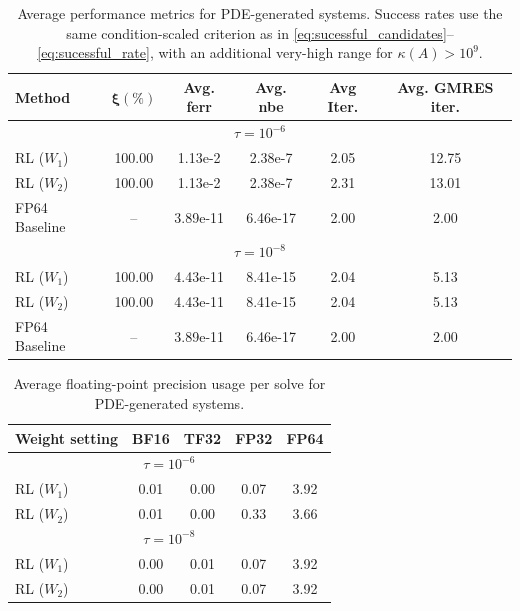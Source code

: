 \documentclass[Afour,sageh,times]{sagej}
\theoremstyle{plain}
\theoremstyle{definition}
\begin{document}
\begin{table}[ht!]
\centering\scriptsize
\setlength{\tabcolsep}{7.5pt}
\renewcommand{\arraystretch}{1.15}
\caption{Average performance metrics for PDE-generated systems. Success rates use the same condition-scaled criterion as in \eqref{eq:sucessful_candidates}--\eqref{eq:sucessful_rate}, with an additional very-high range for $\kappa(A)>10^9$.}
\label{tab:pm_ws_pde}
\begin{tabular}{l
                S[table-format=3.2]
                S[table-format=1.2e-2]
                S[table-format=1.2e-2]
                S[table-format=2.2]
                S[table-format=2.2]}
\toprule
\textbf{Method}
& {$\boldsymbol{\xi(\%)}$}
& {\textbf{Avg. ferr}}
& {\textbf{Avg. nbe}}
& {\textbf{Avg Iter.}}
& {\textbf{Avg. GMRES iter.}}\\
\midrule
{}\\
\midrule
RL ($W_1$)       & 100.00 & 1.13e-2 & 2.38e-7 & 2.05 & 12.75 \\
RL ($W_2$)       & 100.00 & 1.13e-2 & 2.38e-7 & 2.31 & 13.01 \\
FP64 Baseline    & {--}   & 3.89e-11 & 6.46e-17 & 2.00 & 2.00 \\
\midrule[0.55pt]
\\
\midrule
RL ($W_1$)       & 100.00 & 4.43e-11 & 8.41e-15 & 2.04 & 5.13 \\
RL ($W_2$)       & 100.00 & 4.43e-11 & 8.41e-15 & 2.04 & 5.13 \\
FP64 Baseline    & {--}   & 3.89e-11 & 6.46e-17 & 2.00 & 2.00 \\
\bottomrule
\end{tabular}
\end{table}

\begin{table}[ht!]
\centering
\caption{Average floating-point precision usage per solve for PDE-generated systems.}
\label{tab:prec_usage_pde}
\scriptsize
\setlength{\tabcolsep}{8pt}
\renewcommand{\arraystretch}{1.15}
\begin{tabular}{l
                S[table-format=1.2]
                S[table-format=1.2]
                S[table-format=1.2]
                S[table-format=1.2]}
\toprule
\textbf{Weight setting} & \textbf{BF16} & \textbf{TF32} & \textbf{FP32} & \textbf{FP64} \\
\midrule
{}\\
\midrule
{RL ($W_1$)} & 0.01 & 0.00 & 0.07 & 3.92 \\
{RL ($W_2$)} & 0.01 & 0.00 & 0.33 & 3.66 \\
\midrule
{}\\
\midrule
{RL ($W_1$)} & 0.00 & 0.01 & 0.07 & 3.92 \\
{RL ($W_2$)} & 0.00 & 0.01 & 0.07 & 3.92 \\
\bottomrule
\end{tabular}
\end{table}
\end{document}
